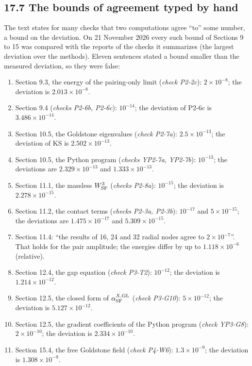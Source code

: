\documentclass[
  10pt,
]{article}
\providecommand{\tightlist}{%
  \setlength{\itemsep}{0pt}\setlength{\parskip}{0pt}}
\begin{document}
\hypertarget{the-bounds-of-agreement-typed-by-hand}{%
\subsection{17.7 The bounds of agreement typed by
hand}\label{the-bounds-of-agreement-typed-by-hand}}

The text states for many checks that two computations agree ``to'' some
number, a bound on the deviation. On 21 November 2026 every such bound
of Sections 9 to 15 was compared with the reports of the checks it
summarizes (the largest deviation over the methods). Eleven sentences
stated a bound smaller than the measured deviation, so they were false:

\begin{enumerate}
\def\labelenumi{\arabic{enumi}.}
\tightlist
\item
  Section 9.3, the energy of the pairing-only limit (\emph{check
  P2-2c}): \(2\times10^{-8}\); the deviation is \(2.013\times10^{-8}\).
\item
  Section 9.4 (\emph{checks P2-6b, P2-6c}): \(10^{-14}\); the deviation
  of P2-6c is \(3.486\times10^{-14}\).
\item
  Section 10.5, the Goldstone eigenvalues (\emph{check P2-7a}):
  \(2.5\times10^{-13}\); the deviation of KS is \(2.502\times10^{-13}\).
\item
  Section 10.5, the Python program (\emph{checks YP2-7a, YP2-7b}):
  \(10^{-13}\); the deviations are \(2.329\times10^{-13}\) and
  \(1.333\times10^{-13}\).
\item
  Section 11.1, the massless \(W^3_{\rm SF}\) (\emph{checks P2-8a}):
  \(10^{-15}\); the deviation is \(2.278\times10^{-15}\).
\item
  Section 11.2, the contact terms (\emph{checks P2-3a, P2-3b}):
  \(10^{-17}\) and \(5\times10^{-15}\); the deviations are
  \(1.475\times10^{-17}\) and \(5.309\times10^{-15}\).
\item
  Section 11.4: ``the results of 16, 24 and 32 radial nodes agree to
  \(2\times10^{-7}\)''. That holds for the pair amplitude; the energies
  differ by up to \(1.118\times10^{-6}\) (relative).
\item
  Section 12.4, the gap equation (\emph{check P3-T2}): \(10^{-12}\); the
  deviation is \(1.214\times10^{-12}\).
\item
  Section 12.5, the closed form of \(\alpha^{X,{\rm GL}}_{\rm SF}\)
  (\emph{check P3-G10}): \(5\times10^{-12}\); the deviation is
  \(5.127\times10^{-12}\).
\item
  Section 12.5, the gradient coefficients of the Python program
  (\emph{check YP3-G8}): \(2\times10^{-10}\); the deviation is
  \(2.334\times10^{-10}\).
\item
  Section 15.4, the free Goldstone field (\emph{check P4-W6}):
  \(1.3\times10^{-9}\); the deviation is \(1.308\times10^{-9}\).
\end{enumerate}
\end{document}
